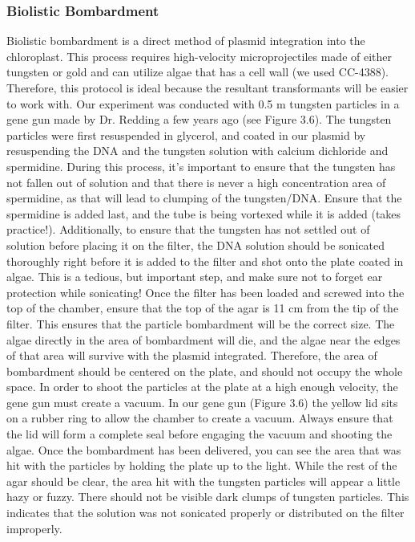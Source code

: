 \subsubsection{Biolistic Bombardment}
Biolistic bombardment is a direct method of plasmid integration into the chloroplast. This process requires high-velocity microprojectiles made of either tungsten or gold and can utilize algae that has a cell wall (we used CC-4388). Therefore, this protocol is ideal because the resultant transformants will be easier to work with. Our experiment was conducted with 0.5 \textmu m tungsten particles in a gene gun made by Dr. Redding a few years ago (see Figure 3.6). The tungsten particles were first resuspended in glycerol, and coated in our plasmid by resuspending the DNA and the tungsten solution with calcium dichloride and spermidine. During this process, it’s important to ensure that the tungsten has not fallen out of solution and that there is never a high concentration area of spermidine, as that will lead to clumping of the tungsten/DNA. Ensure that the spermidine is added last, and the tube is being vortexed while it is added (takes practice!). Additionally, to ensure that the tungsten has not settled out of solution before placing it on the filter, the DNA solution should be sonicated thoroughly right before it is added to the filter and shot onto the plate coated in algae. This is a tedious, but important step, and make sure not to forget ear protection while sonicating! Once the filter has been loaded and screwed into the top of the chamber, ensure that the top of the agar is 11 cm from the tip of the filter. This ensures that the particle bombardment will be the correct size. The algae directly in the area of bombardment will die, and the algae near the edges of that area will survive with the plasmid integrated. Therefore, the area of bombardment should be centered on the plate, and should not occupy the whole space. In order to shoot the particles at the plate at a high enough velocity, the gene gun must create a vacuum. In our gene gun (Figure 3.6) the yellow lid sits on a rubber ring to allow the chamber to create a vacuum. Always ensure that the lid will form a complete seal before engaging the vacuum and shooting the algae. Once the bombardment has been delivered, you can see the area that was hit with the particles by holding the plate up to the light. While the rest of the agar should be clear, the area hit with the tungsten particles will appear a little hazy or fuzzy. There should not be visible dark clumps of tungsten particles. This indicates that the solution was not sonicated properly or distributed on the filter improperly. 
